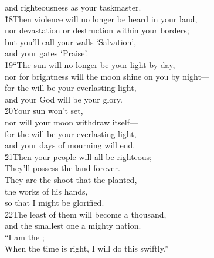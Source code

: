 \begin{poetry}
\poemll    and righteousness as your taskmaster. \\
\poeml \v{18}Then violence will no longer be heard in your land, \\
\poemll    nor devastation or destruction within your borders; \\
\poeml but you'll call your walls `Salvation', \\
\poemll    and your gates `Praise'. \\
\poeml \v{19}``The sun will no longer be your light by day, \\
\poemll    nor for brightness will the moon shine on you by night--- \\
\poeml for the  will be your everlasting light, \\
\poemll    and your God will be your glory. \\
\poeml \v{20}Your sun won't set, \\
\poemll    nor will your moon withdraw itself--- \\
\poeml for the  will be your everlasting light, \\
\poemll    and your days of mourning will end. \\
\poeml \v{21}Then your people will all be righteous; \\
\poemll    They'll possess the land forever. \\
\poeml They are the shoot that the  planted, \\
\poemll    the works of his hands, \\
\poemlll       so that I might be glorified. \\
\poeml \v{22}The least of them will become a thousand, \\
\poemll    and the smallest one a mighty nation. \\
\poeml ``I am the ; \\
\poemll    When the time is right, I will do this swiftly.''
\end{poetry}

